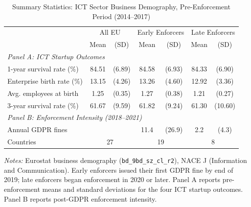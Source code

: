 \begin{table}[t]
\centering
\caption{Summary Statistics: ICT Sector Business Demography, Pre-Enforcement Period (2014--2017)}
\label{tab:sumstats}
\begin{tabular}{lcccccc}
\hline\hline
 & \multicolumn{2}{c}{All EU} & \multicolumn{2}{c}{Early Enforcers} & \multicolumn{2}{c}{Late Enforcers} \\
 & Mean & (SD) & Mean & (SD) & Mean & (SD) \\
\hline
\multicolumn{7}{l}{\textit{Panel A: ICT Startup Outcomes}} \\
1-year survival rate (\%) & 84.51 & (6.89) & 84.58 & (6.93) & 84.33 & (6.90) \\
Enterprise birth rate (\%) & 13.15 & (4.26) & 13.26 & (4.60) & 12.92 & (3.36) \\
Avg. employees at birth & 1.25 & (0.35) & 1.27 & (0.38) & 1.21 & (0.27) \\
3-year survival rate (\%) & 61.67 & (9.59) & 61.82 & (9.24) & 61.30 & (10.60) \\
\hline
\multicolumn{7}{l}{\textit{Panel B: Enforcement Intensity (2018--2021)}} \\
Annual GDPR fines & & & 11.4 & (26.9) & 2.2 & (4.3) \\
Countries & \multicolumn{2}{c}{27} & \multicolumn{2}{c}{19} & \multicolumn{2}{c}{8} \\
\hline\hline
\end{tabular}
\par\vspace{0.3em}\begin{flushleft}\small
\textit{Notes:} Eurostat business demography (\texttt{bd\_9bd\_sz\_cl\_r2}), NACE J (Information and Communication). Early enforcers issued their first GDPR fine by end of 2019; late enforcers began enforcement in 2020 or later. Panel A reports pre-enforcement means and standard deviations for the four ICT startup outcomes. Panel B reports post-GDPR enforcement intensity.
\end{flushleft}
\end{table}

